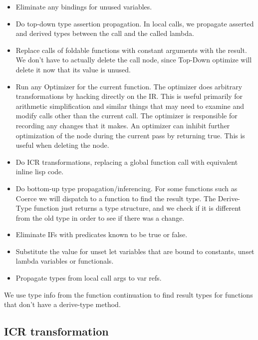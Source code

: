 \begin{itemize}
\item Eliminate any bindings for unused variables.

\item Do top-down type assertion propagation.  In local calls, we propagate
asserted and derived types between the call and the called lambda.

\item
    Replace calls of foldable functions with constant arguments with the
    result.  We don't have to actually delete the call node, since Top-Down
    optimize will delete it now that its value is unused.
 
\item
   Run any Optimizer for the current function.  The optimizer does arbitrary
    transformations by hacking directly on the IR.  This is useful primarily
    for arithmetic simplification and similar things that may need to examine
    and modify calls other than the current call.  The optimizer is responsible
    for recording any changes that it makes.  An optimizer can inhibit further
    optimization of the node during the current pass by returning true.  This
    is useful when deleting the node.

\item
   Do ICR transformations, replacing a global function call with equivalent
    inline lisp code.

\item
    Do bottom-up type propagation/inferencing.  For some functions such as
    Coerce we will dispatch to a function to find the result type.  The
    Derive-Type function just returns a type structure, and we check if it is
    different from the old type in order to see if there was a change.

\item
    Eliminate IFs with predicates known to be true or false.

\item
    Substitute the value for unset let variables that are bound to constants,
    unset lambda variables or functionals.

\item
    Propagate types from local call args to var refs.
\end{itemize}

We use type info from the function continuation to find result types for
functions that don't have a derive-type method.


\subsection{ICR transformation}

